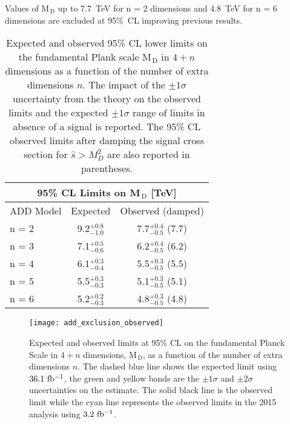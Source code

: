Values of M$_\mathrm{\, D}$ up to 7.7~TeV for n = 2 dimensions and 4.8~TeV for n
= 6 dimensions are excluded at 95\%~CL improving previous results.
\begin{table}[!hb]
  \centering
  \begin{tabular}{lcc}
    \toprule
    \multicolumn{3}{c}{95\% CL Limits on M$_\mathrm{\, D}$
    [TeV]} \\
    \midrule \midrule
    ADD Model & Expected & Observed (damped) \\
    \midrule
    n = 2 & 9.2$^{+0.8}_{-1.0}$ & 7.7$^{+0.4}_{-0.5}$ (7.7) \B \\
    n = 3 & 7.1$^{+0.5}_{-0.6}$ & 6.2$^{+0.4}_{-0.5}$ (6.2) \T \B \\
    n = 4 & 6.1$^{+0.3}_{-0.4}$ & 5.5$^{+0.3}_{-0.5}$ (5.5) \T \B \\
    n = 5 & 5.5$^{+0.3}_{-0.3}$ & 5.1$^{+0.3}_{-0.5}$ (5.1) \T \B \\
    n = 6 & 5.2$^{+0.2}_{-0.3}$ & 4.8$^{+0.3}_{-0.5}$ (4.8) \T \\
    \bottomrule
  \end{tabular}
  \caption{Expected and observed 95\% CL lower limits on the fundamental Plank
      scale M$_\mathrm{\, D}$ in $4 + n$ dimensions as a function of the number
      of extra dimensions $n$. The impact of the $\pm 1 \sigma$ uncertainty from
      the theory on the observed limits and the expected $\pm 1 \sigma$ range of
      limits in absence of a signal is reported. The 95\% CL observed limits
      after damping the signal cross section for $\hat{s} > M_D^2$ are also
      reported in parentheses.}
  \label{tab:add_limits}
\end{table}
\begin{figure}
  \centering
  \texttt{[image: add\_exclusion\_observed]}
  \caption{Expected and observed limits at 95\% CL on the fundamental Planck
    Scale in $4 + n$ dimensions, M$_\mathrm{\, D}$, as a function of the number
    of extra dimensions $n$. The dashed blue line shows the expected limit using
    $36.1~\mbox{fb$^{-1}$}$, the green and yellow bands are the $\pm 1 \sigma$ and
    $\pm 2 \sigma$ uncertainties on the estimate. The solid black line is the
    observed limit while the cyan line represents the observed limits in the
    2015 analysis using $3.2~\mbox{fb$^{-1}$}$.}
  \label{fig:add_observed}
\end{figure}
